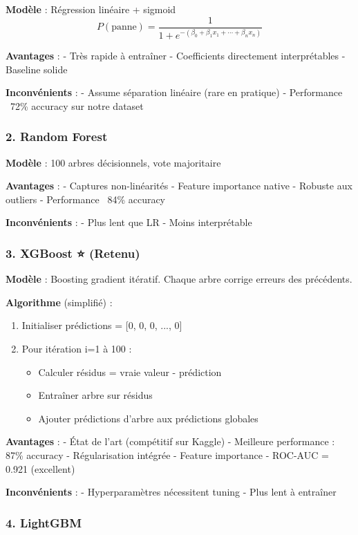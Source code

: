 \documentclass[12pt,a4paper,french]{article}
\begin{document}
\textbf{Modèle} : Régression linéaire + sigmoid
$$P(\text{panne}) = \frac{1}{1 + e^{-(\beta_0 + \beta_1 x_1 + \cdots + \beta_n x_n)}}$$

\textbf{Avantages} :
- Très rapide à entraîner
- Coefficients directement interprétables
- Baseline solide

\textbf{Inconvénients} :
- Assume séparation linéaire (rare en pratique)
- Performance ~72\% accuracy sur notre dataset

\subsubsection{2. Random Forest}

\textbf{Modèle} : 100 arbres décisionnels, vote majoritaire

\textbf{Avantages} :
- Captures non-linéarités
- Feature importance native
- Robuste aux outliers
- Performance ~84\% accuracy

\textbf{Inconvénients} :
- Plus lent que LR
- Moins interprétable

\subsubsection{3. XGBoost ⭐ (Retenu)}

\textbf{Modèle} : Boosting gradient itératif. Chaque arbre corrige erreurs des précédents.

\textbf{Algorithme} (simplifié) :
\begin{enumerate}
    \item Initialiser prédictions = [0, 0, 0, ..., 0]
    \item Pour itération i=1 à 100 :
    \begin{itemize}
        \item Calculer résidus = vraie valeur - prédiction
        \item Entraîner arbre sur résidus
        \item Ajouter prédictions d'arbre aux prédictions globales
    \end{itemize}
\end{enumerate}

\textbf{Avantages} :
- État de l'art (compétitif sur Kaggle)
- Meilleure performance : 87\% accuracy
- Régularisation intégrée
- Feature importance
- ROC-AUC = 0.921 (excellent)

\textbf{Inconvénients} :
- Hyperparamètres nécessitent tuning
- Plus lent à entraîner

\subsubsection{4. LightGBM}
\end{document}
